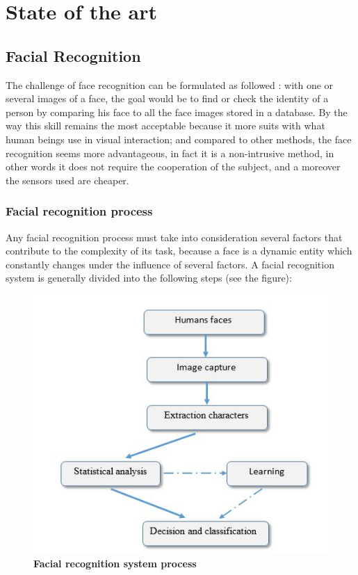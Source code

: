 \chapter{State of the art}


\section{Facial Recognition}
The challenge of face recognition can be formulated as followed :  with one or several images of a face, the goal would be to find or check the identity of a person by comparing his face to all the face images stored in a database. By the way this skill remains the most acceptable because it more suits with what human beings use in visual interaction; and compared to other methods, the face recognition seems more advantageous, in fact it is a non-intrusive method, in other words it does not require the cooperation of the subject, and a moreover the sensors used are cheaper.


\subsection{Facial recognition process}
Any facial recognition process must take into consideration several factors that contribute to the complexity of its task, because a face is a dynamic entity which constantly changes under the influence of several factors. A facial recognition system is generally  divided into the following steps (see the figure):

\begin{figure}[bth]%
\begin{center}
\includegraphics[scale=0.75]{fr_process}%
\caption{\textbf{Facial recognition system process}}%
\label{fr_process}%
\end {center}
\end{figure}

